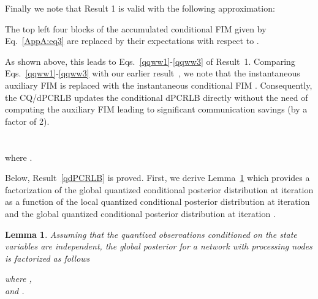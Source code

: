 \documentclass[10pt,twocolumn,twoside]{IEEEtran}
\newtheorem{lemma}{\bf{Lemma}}
\begin{document}
Finally we note that Result 1 is valid with the following approximation:

The top left  four blocks of the accumulated conditional FIM given by Eq.~\eqref{AppA:eq3}
are replaced by their expectations with respect to .

As shown above, this leads to Eqs.~\eqref{qqww1}-\eqref{qqww3} of Result~1. Comparing Eqs.~\eqref{qqww1}-\eqref{qqww3} with our earlier result~\cite{Arash:SPL}, we note that the instantaneous auxiliary FIM  is replaced with the instantaneous conditional FIM . Consequently, the CQ/dPCRLB updates the
conditional dPCRLB directly without the need of computing the
auxiliary FIM leading to significant communication savings (by a factor of 2).
\section{} \label{app:B}
\begin{figure*}[t]
\normalsize
\setcounter{equation}{52}

where .

\setcounter{equation}{42}
\hrulefill
\vspace*{4pt}
\end{figure*}
Below, Result~\ref{qdPCRLB} is proved.
First, we derive Lemma~\ref{lemma/post/fac/CDpcrlb} which provides a factorization of the global quantized conditional
posterior distribution  at iteration  as a function of the local quantized conditional
posterior distribution  at iteration  and the global  quantized conditional
posterior distribution  at iteration .
\begin{lemma}\label{lemma/post/fac/CDpcrlb}
Assuming that the quantized observations conditioned on the state variables are
independent, the global posterior for a  network with  processing nodes is
factorized as follows

where , \\
and .
\end{lemma}
\end{document}
